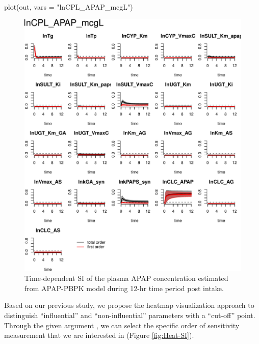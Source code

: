 \begin{Schunk}
\begin{Sinput}
plot(out, vars = "lnCPL_APAP_mcgL")
\end{Sinput}
\begin{figure}

{\centering \includegraphics[width=0.8\linewidth]{RJ-pksensi_files/figure-latex/unnamed-chunk-30-1} 

}

\caption{\label{fig:APAP-sensi}Time-dependent SI of the plasma APAP concentration estimated from APAP-PBPK model during 12-hr time period post intake.}\label{fig:unnamed-chunk-30}
\end{figure}
\end{Schunk}

Based on our previous study, we propose the heatmap visualization
approach  to distinguish ``influential'' and
``non-influential'' parameters with a ``cut-off'' point. Through the
given argument , we can select the specific order of
sensitivity measurement that we are interested in (Figure
\ref{fig:Heat-SI}).

